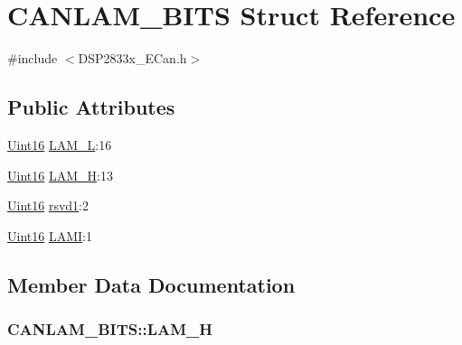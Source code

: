\hypertarget{struct_c_a_n_l_a_m___b_i_t_s}{}\section{C\+A\+N\+L\+A\+M\+\_\+\+B\+I\+T\+S Struct Reference}
\label{struct_c_a_n_l_a_m___b_i_t_s}


{\ttfamily \#include $<$D\+S\+P2833x\+\_\+\+E\+Can.\+h$>$}

\subsection*{Public Attributes}
\begin{DoxyCompactItemize}
\item 
\hyperlink{_d_s_p2833x___device_8h_a59a9f6be4562c327cbfb4f7e8e18f08b}{Uint16} \hyperlink{struct_c_a_n_l_a_m___b_i_t_s_aded7666b671ea3f7dfca691f6914a381}{L\+A\+M\+\_\+\+L}\+:16
\item 
\hyperlink{_d_s_p2833x___device_8h_a59a9f6be4562c327cbfb4f7e8e18f08b}{Uint16} \hyperlink{struct_c_a_n_l_a_m___b_i_t_s_a2e515b0d57eacb5997a27b00f34d0164}{L\+A\+M\+\_\+\+H}\+:13
\item 
\hyperlink{_d_s_p2833x___device_8h_a59a9f6be4562c327cbfb4f7e8e18f08b}{Uint16} \hyperlink{struct_c_a_n_l_a_m___b_i_t_s_a9ba6c8bcf2f6fa5b05718e5415bccc80}{rsvd1}\+:2
\item 
\hyperlink{_d_s_p2833x___device_8h_a59a9f6be4562c327cbfb4f7e8e18f08b}{Uint16} \hyperlink{struct_c_a_n_l_a_m___b_i_t_s_a97fe962385bd127ca3fd695b3ba03475}{L\+A\+M\+I}\+:1
\end{DoxyCompactItemize}


\subsection{Member Data Documentation}
\hypertarget{struct_c_a_n_l_a_m___b_i_t_s_a2e515b0d57eacb5997a27b00f34d0164}{}
\subsubsection[{L\+A\+M\+\_\+\+H}]{ C\+A\+N\+L\+A\+M\+\_\+\+B\+I\+T\+S\+::\+L\+A\+M\+\_\+\+H}\label{struct_c_a_n_l_a_m___b_i_t_s_a2e515b0d57eacb5997a27b00f34d0164}
\hypertarget{struct_c_a_n_l_a_m___b_i_t_s_aded7666b671ea3f7dfca691f6914a381}{}
